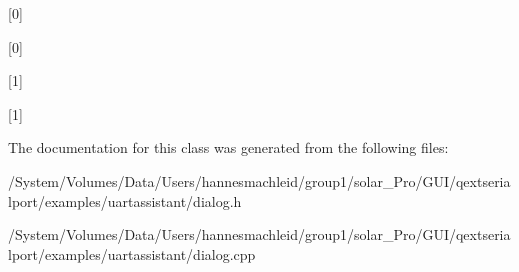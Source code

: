 \mbox{[}0\mbox{]}

\mbox{[}0\mbox{]}

\mbox{[}1\mbox{]}

\mbox{[}1\mbox{]} 

The documentation for this class was generated from the following files\+:\begin{DoxyCompactItemize}
\item 
/\+System/\+Volumes/\+Data/\+Users/hannesmachleid/group1/solar\+\_\+\+Pro/\+G\+U\+I/qextserialport/examples/uartassistant/dialog.\+h\item 
/\+System/\+Volumes/\+Data/\+Users/hannesmachleid/group1/solar\+\_\+\+Pro/\+G\+U\+I/qextserialport/examples/uartassistant/dialog.\+cpp\end{DoxyCompactItemize}
